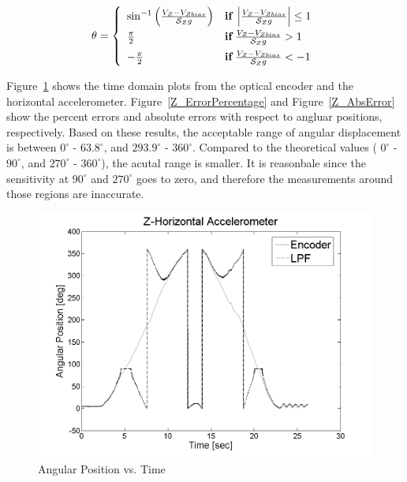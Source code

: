\documentclass{article}
\theoremstyle{plain}
\theoremstyle{definition}
\theoremstyle{remark}
\newcommand{\Sens}{\mathcal{S}}
\begin{document}
$$\theta = \left\{ 
	\begin{array}{l l}
		\sin^{-1} \left(\frac{V_{Z} - V_{Zbias}}{\Sens_{Z} g} \right) & {\bf{if }} \, \left| \frac{V_{Z} - V_{Zbias}}{\Sens_{Z} g} \right| \leq 1 \\[6pt]
		\frac{\pi}{2} & {\bf{if }} \, \frac{V_{Z} - V_{Zbias}}{\Sens_{Z} g} > 1 \\[6pt]
		-\frac{\pi}{2} & {\bf{if} } \, \frac{V_{Z} - V_{Zbias}}{\Sens_{Z} g} < -1
	\end{array} \right. $$

Figure~\ref{Z_TimeDomain} shows the time domain plots from the optical encoder and the horizontal accelerometer. Figure~\ref{Z_ErrorPercentage} and Figure~\ref{Z_AbsError} show the percent errors and absolute errors with respect to angluar positions, respectively. Based on these results, the acceptable range of angular displacement is between $0^\circ$ - $63.8^\circ$, and $293.9^\circ$ - $360^\circ$. Compared to the theoretical values ( $0^\circ$ - $90^\circ$, and $270^\circ$ - $360^\circ$), the acutal range is smaller. It is reasonbale since the sensitivity at $90^\circ$ and $270^\circ$ goes to zero, and therefore the measurements around those regions are inaccurate. \\

\begin{figure}[hbt]
\begin{center}
\includegraphics[width = 13cm]{Z_TimeDomain.png}
\caption{Angular Position vs. Time}
\label{Z_TimeDomain}
\end{center}
\end{figure}
\end{document}
